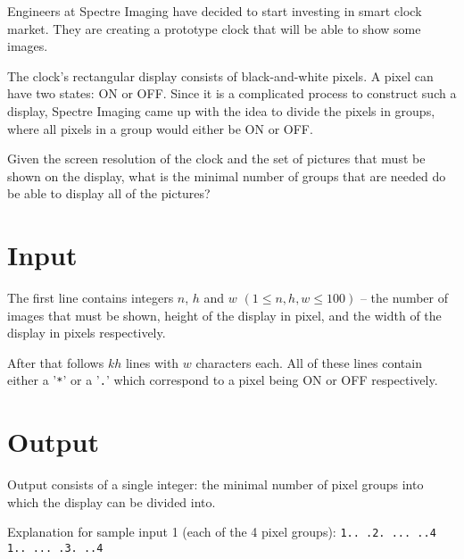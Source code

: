 
Engineers at Spectre Imaging have decided to start investing in smart clock market. They are creating a prototype clock that will be able to show some images.

The clock's rectangular display consists of black-and-white pixels. A pixel can have two states: ON or OFF. Since it is a complicated process to construct such a display, Spectre Imaging came up with the idea to divide the pixels in groups, where all pixels in a group would either be ON or OFF.

Given the screen resolution of the clock and the set of pictures that must be shown on the display, what is the minimal number of groups that are needed do be able to display all of the pictures?

\section*{Input}

The first line contains integers $n$, $h$ and $w$ $(1 \leq n,h,w \leq 100)$ -- the number of images that must be shown, height of the display in pixel, and the width of the display in pixels respectively.

After that follows $kh$ lines with $w$ characters each. All of these lines contain either a '\texttt{*}' or a '\texttt{.}' which correspond to a pixel being ON or OFF respectively.

\section*{Output}

Output consists of a single integer: the minimal number of pixel groups into which the display can be divided into.

Explanation for sample input 1 (each of the 4 pixel groups): \newline
\texttt{1.. .2. ... ..4} \newline
\texttt{1.. ... .3. ..4} \newline

